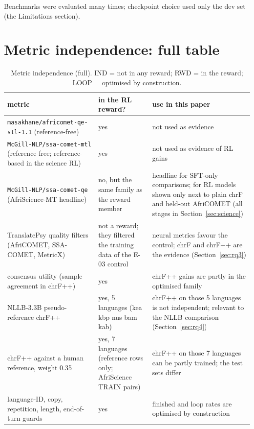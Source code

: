 Benchmarks were evaluated many times; checkpoint choice used only the dev set (the Limitations section).

\section{Metric independence: full table}\label{app:indep}

\begin{table}[t]
\centering\footnotesize
\setlength{\tabcolsep}{4pt}
\caption{Metric independence (full). IND = not in any reward; RWD = in the reward; LOOP = optimised by construction.}\label{tab:indep_full}
\begin{tabularx}{\linewidth}{@{}>{\raggedright\arraybackslash}X>{\raggedright\arraybackslash}X>{\raggedright\arraybackslash}X@{}}
\toprule
metric & in the RL reward? & use in this paper \\
\midrule
\texttt{masakhane/\allowbreak{}africomet-\allowbreak{}qe-\allowbreak{}stl-\allowbreak{}1.\allowbreak{}1} (reference-free) & yes & not used as evidence \\
\texttt{McGill-\allowbreak{}NLP/\allowbreak{}ssa-\allowbreak{}comet-\allowbreak{}mtl} (reference-free; reference-based in the science RL) & yes & not used as evidence of RL gains \\
\texttt{McGill-\allowbreak{}NLP/\allowbreak{}ssa-\allowbreak{}comet-\allowbreak{}qe} (AfriScience-MT headline) & no, but the same family as the reward member & headline for SFT-only comparisons; for RL models shown only next to plain chrF and held-out AfriCOMET (all stages in Section~\ref{sec:science}) \\
TranslatePsy quality filters (AfriCOMET, SSA-COMET, MetricX) & not a reward; they filtered the training data of the E-03 control & neural metrics favour the control; chrF and chrF++ are the evidence (Section~\ref{sec:rq3}) \\
consensus utility (sample agreement in chrF++) & yes & chrF++ gains are partly in the optimised family \\
NLLB-3.3B pseudo-reference chrF++ & yes, 5 languages (kea kbp nus bam kab) & chrF++ on those 5 languages is not independent; relevant to the NLLB comparison (Section~\ref{sec:rq4}) \\
chrF++ against a human reference, weight 0.35 & yes, 7 languages (reference rows only; AfriScience TRAIN pairs) & chrF++ on those 7 languages can be partly trained; the test sets differ \\
language-ID, copy, repetition, length, end-of-turn guards & yes & finished and loop rates are optimised by construction \\

\end{tabularx}
\end{table}
